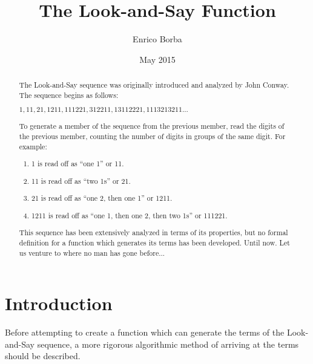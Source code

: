 \documentclass{article}
\begin{document}
	\title{The Look-and-Say Function}
	\author{Enrico Borba}
	\date{May 2015}
	\maketitle

	\begin{abstract}
		The Look-and-Say sequence was originally introduced and analyzed by John Conway. 
		The sequence begins as follows:
		\begin{center}
		$1, 11, 21, 1211, 111221, 312211, 13112221, 1113213211...$
		\end{center}
		To generate a member of the sequence from the previous member, read 
		the digits of the previous member, counting the number of digits in 
		groups of the same digit. For example:
		\begin{enumerate}
			\item 1 is read off as ``one 1'' or 11.
			\item 11 is read off as ``two 1s'' or 21.
			\item 21 is read off as ``one 2, then one 1'' or 1211.
			\item 1211 is read off as ``one 1, then one 2, then two 1s'' or 111221.
		\end{enumerate}
		This sequence has been extensively analyzed in terms of its properties, but no formal 
		definition for a function which generates its terms has been developed.
		Until now. Let us venture to where no man has gone before...
	\end{abstract}
	\clearpage
	
	\section{Introduction}
	Before attempting to create a function which can generate the terms of the Look-and-Say
	sequence, a more rigorous algorithmic method of arriving at the terms should be described.
	
\end{document}
